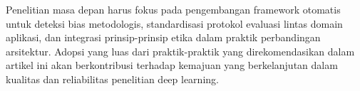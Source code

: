 \documentclass[12pt,a4paper]{article}
\begin{document}
Penelitian masa depan harus fokus pada pengembangan framework otomatis untuk deteksi bias metodologis, standardisasi protokol evaluasi lintas domain aplikasi, dan integrasi prinsip-prinsip etika dalam praktik perbandingan arsitektur. Adopsi yang luas dari praktik-praktik yang direkomendasikan dalam artikel ini akan berkontribusi terhadap kemajuan yang berkelanjutan dalam kualitas dan reliabilitas penelitian deep learning.



\end{document}
